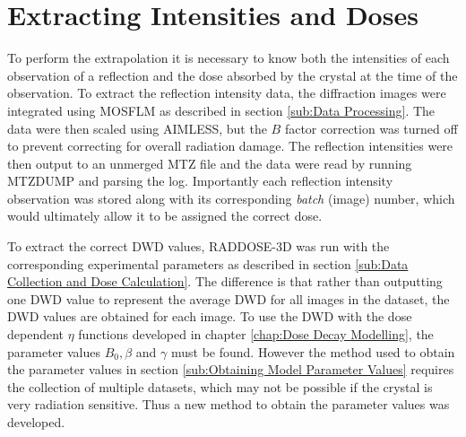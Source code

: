 \section{Extracting Intensities and Doses}
\label{sec:Extracting Intensities and Doses}
To perform the extrapolation it is necessary to know both the intensities of each observation of a reflection and the dose absorbed by the crystal at the time of the observation.
To extract the reflection intensity data, the diffraction images were integrated using MOSFLM as described in section \ref{sub:Data Processing}.
The data were then scaled using AIMLESS, but the $B$ factor correction was turned off to prevent correcting for overall radiation damage.
The reflection intensities were then output to an unmerged MTZ file and the data were read by running MTZDUMP and parsing the log.
Importantly each reflection intensity observation was stored along with its corresponding \textit{batch} (image) number, which would ultimately allow it to be assigned the correct dose.

To extract the correct DWD values, RADDOSE-3D was run with the corresponding experimental parameters as described in section \ref{sub:Data Collection and Dose Calculation}.
The difference is that rather than outputting one DWD value to represent the average DWD for all images in the dataset, the DWD values are obtained for each image.
To use the DWD with the dose dependent $\eta$ functions developed in chapter \ref{chap:Dose Decay Modelling}, the parameter values $B_0, \beta$ and $\gamma$ must be found.
However the method used to obtain the parameter values in section \ref{sub:Obtaining Model Parameter Values} requires the collection of multiple datasets, which may not be possible if the crystal is very radiation sensitive.
Thus a new method to obtain the parameter values was developed.

